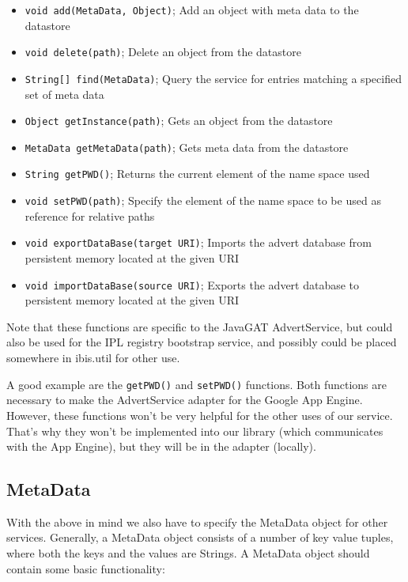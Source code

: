 \begin{itemize}
\item \texttt{void add(MetaData, Object)}; Add an object with meta data to the
datastore
\item \texttt{void delete(path)}; Delete an object from the datastore
\item \texttt{String[] find(MetaData)}; Query the service for entries matching
a specified set of meta data
\item \texttt{Object getInstance(path)}; Gets an object from the datastore
\item \texttt{MetaData getMetaData(path)}; Gets meta data from the datastore
\item \texttt{String getPWD()}; Returns the current element of the name space
used
\item \texttt{void setPWD(path)}; Specify the element of the name space to be
used as reference for relative paths
\item \texttt{void exportDataBase(target URI)}; Imports the advert database
from persistent memory located at the given URI
\item \texttt{void importDataBase(source URI)}; Exports the advert database to
persistent memory located at the given URI 
\end{itemize}

Note that these functions are specific to the JavaGAT AdvertService, but could
also be used for the IPL registry bootstrap service, and possibly could be placed
somewhere in ibis.util for other use.

A good example are the \texttt{getPWD()} and \texttt{setPWD()} functions. Both
functions are necessary to make the AdvertService adapter for the Google App
Engine. However, these functions won't be very helpful for the other uses of our
service. That's why they won't be implemented into our library (which
communicates with the App Engine), but they will be in the adapter (locally).

\subsection{MetaData}
With the above in mind we also have to specify the MetaData object for other
services. Generally, a MetaData object consists of a number of key value tuples,
where both the keys and the values are Strings. A MetaData object should contain
some basic functionality:

